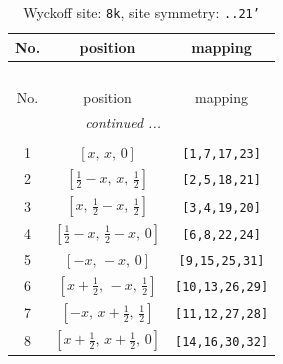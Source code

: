 \documentclass[fleqn,8pt]{jsarticle}
\begin{document}
\begin{longtable}{ccc}
\caption{Wyckoff site: {\tt 8k}, site symmetry: {\tt ..21'}}
 \\
 \hline \hline
No. & position & mapping \\ \hline \endfirsthead

\multicolumn{2}{l}{\tablename\ \thetable{}} \\
 \hline \hline
No. & position & mapping \\ \hline \endhead

 \hline \hline
\multicolumn{2}{r}{\footnotesize\it continued ...} \\ \endfoot

 \hline \hline
\multicolumn{2}{r}{} \\ \endlastfoot

1 & $\left[ x,\, x,\, 0 \right]$ & {\tt [1,7,17,23]} \\ \hline
2 & $\left[ \frac{1}{2} - x,\, x,\, \frac{1}{2} \right]$ & {\tt [2,5,18,21]} \\ \hline
3 & $\left[ x,\, \frac{1}{2} - x,\, \frac{1}{2} \right]$ & {\tt [3,4,19,20]} \\ \hline
4 & $\left[ \frac{1}{2} - x,\, \frac{1}{2} - x,\, 0 \right]$ & {\tt [6,8,22,24]} \\ \hline
5 & $\left[ - x,\, - x,\, 0 \right]$ & {\tt [9,15,25,31]} \\ \hline
6 & $\left[ x + \frac{1}{2},\, - x,\, \frac{1}{2} \right]$ & {\tt [10,13,26,29]} \\ \hline
7 & $\left[ - x,\, x + \frac{1}{2},\, \frac{1}{2} \right]$ & {\tt [11,12,27,28]} \\ \hline
8 & $\left[ x + \frac{1}{2},\, x + \frac{1}{2},\, 0 \right]$ & {\tt [14,16,30,32]} \\
\end{longtable}
\renewcommand{\arraystretch}{1.2}
\end{document}
